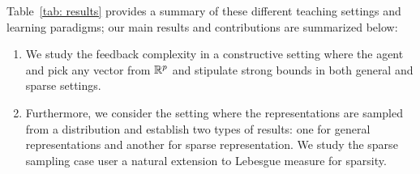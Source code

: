  Table~\ref{tab: results} provides a summary of these different teaching settings and learning paradigms; our main results and contributions are summarized below:
\begin{enumerate}[label={\Roman*.},leftmargin=*]

    \item We study the feedback complexity in a constructive setting where the agent and pick any vector from $\mathbb{R}^p$ and stipulate strong bounds in both general and sparse settings.
    \item{} Furthermore, we consider the setting where the representations are sampled from a distribution and establish two types of results: one for general representations and another for sparse representation. We study the sparse sampling case user a natural extension to Lebesgue measure for sparsity.

\end{enumerate}
